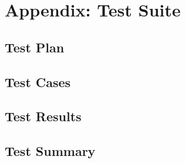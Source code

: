 \chapter{Appendix: Test Suite}
\blindtext%

\section{Test Plan}
\blindtext%

\section{Test Cases}
\blindtext%

\section{Test Results}
\blindtext%

\section{Test Summary}
\blindtext%
